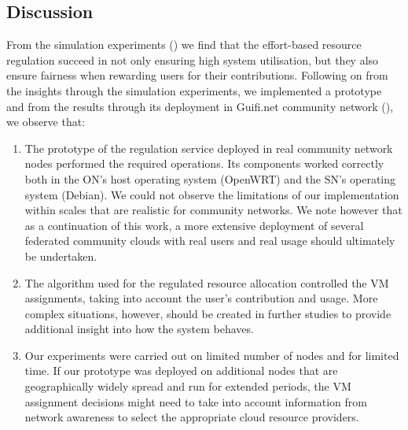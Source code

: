 

\subsection{Discussion}
\label{sec:prototype-discussion}

From the simulation experiments () we find that
the effort-based resource regulation succeed in not only ensuring high system utilisation, 
but they also ensure fairness when rewarding users for their contributions.
Following on from the insights through the simulation experiments,
we implemented a prototype and from the results through its deployment in Guifi.net community network (),
we observe that:

\begin{enumerate}

   \item The prototype of the regulation service deployed in real community network nodes performed the required operations. 
   Its components worked correctly both in the ON's host operating system (OpenWRT) and the SN's operating system (Debian). 
   We could not observe the limitations of our implementation within scales that are realistic for community networks. 
   We note however that as a continuation of this work, a more extensive deployment of several federated community clouds with real users and real usage should ultimately be undertaken.  
   
   \item The algorithm used for the regulated resource allocation controlled the VM assignments, taking into account the user's contribution and usage. 
   More complex situations, however, should be created in further studies to provide additional insight into how the system behaves.
   
   \item Our experiments were carried out on limited number of nodes and for limited time.
   If our prototype was deployed on additional nodes that are geographically widely spread and run for extended periods, the VM assignment decisions might need to take into account information from network awareness to select the appropriate cloud resource providers.
   
\end{enumerate}

